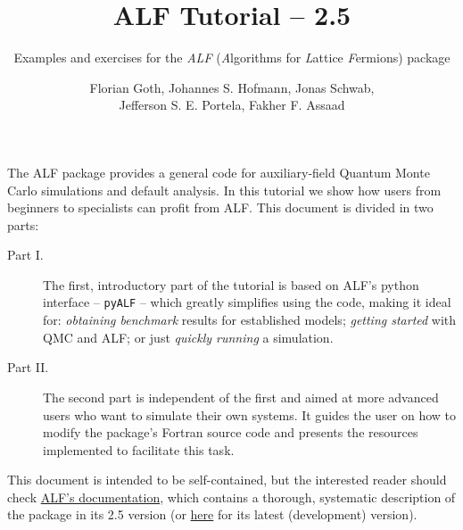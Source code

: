 \documentclass[10pt,modern]{scrartcl}
\numberwithin{exerciseitem}{exercise} %
\newcommand{\ALFver}{2.5}          %
\newcommand{\ALFbranch}{ALF-2.5}   %
\newcommand{\tutALFver}{2.5}       %
\begin{document}
\title{ ALF Tutorial -- \tutALFver{} }
\subtitle{Examples and exercises for the \emph{ALF} (\emph{A}lgorithms for \emph{L}attice \emph{F}ermions) package} %
\author{Florian Goth,  Johannes S. Hofmann,  Jonas Schwab,\\  Jefferson S. E. Portela,  Fakher F. Assaad }
\maketitle



The ALF package provides a general code for auxiliary-field Quantum Monte Carlo simulations and default analysis. In this tutorial we show how users from beginners to specialists can profit from ALF. This document is divided in two parts:
\begin{description}
\item[Part I.] The first, introductory part of the tutorial is based on ALF's python interface -- \texttt{pyALF} -- which greatly simplifies using the code, making it ideal for: \emph{obtaining benchmark} results for established models; \emph{getting started} with QMC and ALF; or just \emph{quickly running} a simulation.
\item[Part II.] The second part is independent of the first and aimed at more advanced users who want to simulate their own systems. It guides the user on how to modify the package's Fortran source code and presents the resources implemented to facilitate this task.
\end{description}

This document is intended to be self-contained, but the interested reader should check \href{https://git.physik.uni-wuerzburg.de/ALF/ALF/-/blob/\ALFbranch/Documentation/doc.pdf}{ALF's documentation}, which contains a thorough, systematic description of the package in its \ALFver{} version (or \href{https://git.physik.uni-wuerzburg.de/ALF/ALF/-/blob/master/Documentation/doc.pdf}{here} for its latest (development) version).
\end{document}
